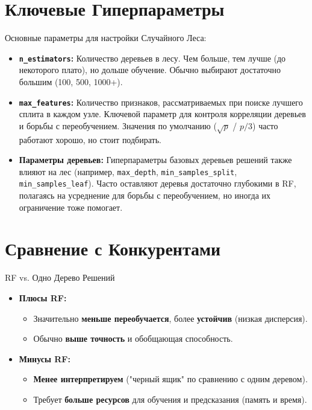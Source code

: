 \section{Ключевые Гиперпараметры}
Основные параметры для настройки Случайного Леса:
\begin{itemize}
    \item \textbf{\texttt{n\_estimators}:} Количество деревьев в лесу. Чем больше, тем лучше (до некоторого плато), но дольше обучение. Обычно выбирают достаточно большим (100, 500, 1000+).
    \item \textbf{\texttt{max\_features}:} Количество признаков, рассматриваемых при поиске лучшего сплита в каждом узле. Ключевой параметр для контроля корреляции деревьев и борьбы с переобучением. Значения по умолчанию (\(\sqrt{p}\) / \(p/3\)) часто работают хорошо, но стоит подбирать.
    \item \textbf{Параметры деревьев:} Гиперпараметры базовых деревьев решений также влияют на лес (например, \texttt{max\_depth}, \texttt{min\_samples\_split}, \texttt{min\_samples\_leaf}). Часто оставляют деревья достаточно глубокими в RF, полагаясь на усреднение для борьбы с переобучением, но иногда их ограничение тоже помогает.
\end{itemize}

\section{Сравнение с Конкурентами}

\begin{myblock}{RF vs. Одно Дерево Решений}
    \begin{itemize}
        \item \textbf{Плюсы RF:}
            \begin{itemize}
                \item Значительно \textbf{меньше переобучается}, более \textbf{устойчив} (низкая дисперсия).
                \item Обычно \textbf{выше точность} и обобщающая способность.
            \end{itemize}
        \item \textbf{Минусы RF:}
            \begin{itemize}
                \item \textbf{Менее интерпретируем} ("черный ящик" по сравнению с одним деревом).
                \item Требует \textbf{больше ресурсов} для обучения и предсказания (память и время).
            \end{itemize}
    \end{itemize}
\end{myblock}

